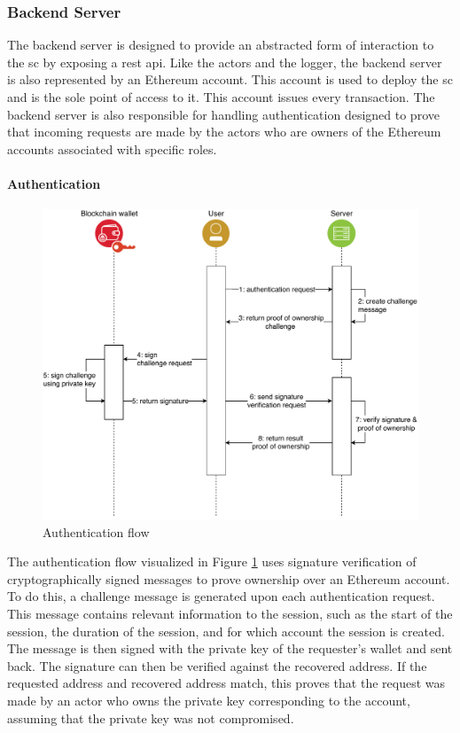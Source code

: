\subsubsection{Backend Server}
The backend server is designed to provide an abstracted form of interaction to the \gls{sc} by exposing a \gls{rest} \gls{api}. Like the actors and the logger, the backend server is also represented by an Ethereum account. This account is used to deploy the \gls{sc} and is the sole point of access to it. This account issues every transaction. The backend server is also responsible for handling authentication designed to prove that incoming requests are made by the actors who are owners of the Ethereum accounts associated with specific roles.

\paragraph{Authentication}
\label{sec:authentication}

\begin{figure}[h]
    \centering
    \includegraphics[width=\textwidth, keepaspectratio]{diagrams/authentication_flow.drawio.pdf}
    \caption{Authentication flow}
    \label{fig:auth_flow}
\end{figure}

The authentication flow visualized in Figure \ref{fig:auth_flow} uses signature verification of cryptographically signed messages to prove ownership over an Ethereum account. To do this, a challenge message is generated upon each authentication request. This message contains relevant information to the session, such as the start of the session, the duration of the session, and for which account the session is created. The message is then signed with the private key of the requester's wallet and sent back. The signature can then be verified against the recovered address. If the requested address and recovered address match, this proves that the request was made by an actor who owns the private key corresponding to the account, assuming that the private key was not compromised.

